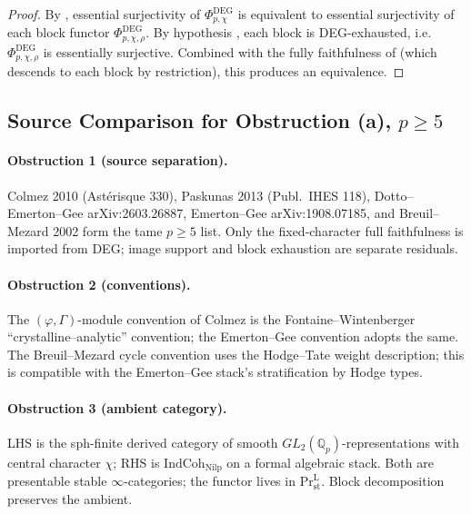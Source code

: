 \begin{proof}
By , essential
surjectivity of \(\Phi^{\mathrm{DEG}}_{p,\chi}\) is equivalent to
essential surjectivity of each block functor \(\Phi^{\mathrm{DEG}}_{p,\chi,\rho}\).
By hypothesis , each
block is DEG-exhausted, i.e.\ \(\Phi^{\mathrm{DEG}}_{p,\chi,\rho}\) is
essentially surjective. Combined with the fully faithfulness of
 (which descends to each
block by restriction), this produces an equivalence.
\end{proof}

\subsection{Source Comparison for Obstruction (a), \texorpdfstring{\(p\geq 5\)}{p>=5}}

\paragraph{Obstruction 1 (source separation).} Colmez 2010 (Ast\'erisque
330), Paskunas 2013 (Publ.~IHES 118), Dotto--Emerton--Gee
arXiv:2603.26887, Emerton--Gee arXiv:1908.07185, and
Breuil--Mezard 2002 form the tame \(p\geq 5\) list.  Only the
fixed-character full faithfulness is imported from DEG; image support
and block exhaustion are separate residuals.

\paragraph{Obstruction 2 (conventions).} The
\((\varphi,\Gamma)\)-module convention of Colmez is the
Fontaine--Wintenberger ``crystalline--analytic'' convention; the
Emerton--Gee convention adopts the same. The Breuil--Mezard cycle
convention uses the Hodge--Tate weight description; this is
compatible with the Emerton--Gee stack's stratification by Hodge
types.

\paragraph{Obstruction 3 (ambient category).} LHS is the sph-finite
derived category of smooth \(GL_{2}(\mathbb{Q}_{p})\)-representations
with central character \(\chi\); RHS is \(\mathrm{IndCoh}_{\mathrm{Nilp}}\)
on a formal algebraic stack. Both are presentable stable \(\infty\)-categories;
the functor lives in \(\mathrm{Pr}^{\mathrm{L}}_{\mathrm{st}}\). Block
decomposition preserves the ambient.

